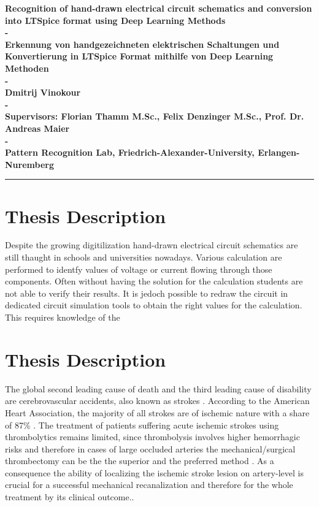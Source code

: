 \documentclass{article}%
\begin{document}
\begin{center}

\textbf{
        \huge{Recognition of hand-drawn electrical circuit schematics and conversion into LTSpice format using Deep Learning Methods}
        \\-\\
        \large{Erkennung von handgezeichneten elektrischen Schaltungen und Konvertierung in LTSpice Format mithilfe von Deep Learning Methoden}
        \\-\\
        Dmitrij Vinokour
        \\-\\
        Supervisors: Florian Thamm M.Sc., Felix Denzinger M.Sc., Prof. Dr. Andreas Maier
        \\-\\
        Pattern Recognition Lab, Friedrich-Alexander-University, Erlangen-Nuremberg
}
\noindent\rule{\textwidth}{1pt}

\section*{Thesis Description}
Despite the growing digitilization hand-drawn electrical circuit schematics are still thaught in schools and universities nowadays. Various calculation are performed to identfy values of voltage or current flowing through those components. Often without having the solution for the calculation students are not able to verify their results. It is jedoch possible to redraw the circuit in dedicated circuit simulation tools to obtain the right values for the calculation. This requires knowledge of the






\section*{Thesis Description}
The global second leading cause of death and the third leading cause of disability are cerebrovascular accidents, also known as strokes \cite{JohnsonStroke, DONNAN20081612}. According to the American Heart Association, the majority of all strokes are of ischemic nature with a share of 87\% \cite{mozaffarian2016heart}. The treatment of patients suffering acute ischemic strokes using thrombolytics remains limited, since thrombolysis involves higher hemorrhagic risks and therefore in cases of large occluded arteries the mechanical/surgical thrombectomy can be the the superior and the preferred method \cite{torbey2013stroke, el2017thrombolysis}. As a consequence the ability of localizing the ischemic stroke lesion on artery-level is crucial for a successful mechanical recanalization and therefore for the whole treatment by its clinical outcome.\cite{torbey2013stroke, palaniswami2015mechanical}.\\\\


\end{center}
\end{document}
